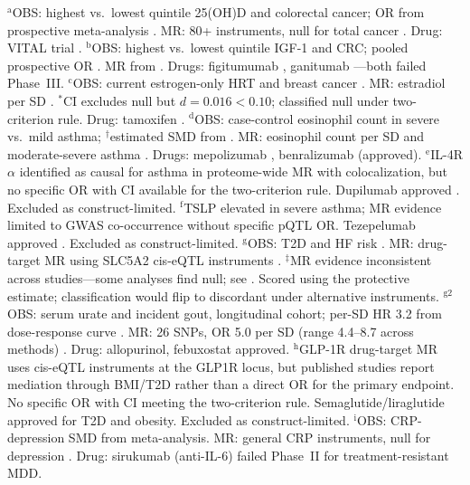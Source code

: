 \documentclass[11pt]{article}
\begin{document}
\begin{table}[t]
\vspace{1mm}
{\footnotesize
$^\text{a}$OBS: highest vs.\ lowest quintile 25(OH)D and colorectal cancer; OR from prospective meta-analysis \cite{keum2014vitdobscancer}. MR: 80+ instruments, null for total cancer \cite{ong2021vitdcancer}. Drug: VITAL trial \cite{manson2019vital}.
$^\text{b}$OBS: highest vs.\ lowest quintile IGF-1 and CRC; pooled prospective OR \cite{rinaldi2019igfobs}. MR from \citet{larsson2020igfcancer}. Drugs: figitumumab \cite{langer2014figitumumab}, ganitumab \cite{juergens2023ganitumab}---both failed Phase~III.
$^\text{c}$OBS: current estrogen-only HRT and breast cancer \cite{beral2003mws}. MR: estradiol per SD \cite{shi2023estradiolBC}. $^*$CI excludes null but $d = 0.016 < 0.10$; classified null under two-criterion rule. Drug: tamoxifen \cite{cuzick2015tamoxifen}.
$^\text{d}$OBS: case-control eosinophil count in severe vs.\ mild asthma; $^\dagger$estimated SMD from \citet{wagener2022eosinophils}. MR: eosinophil count per SD and moderate-severe asthma \cite{han2020eosinophilasthma}. Drugs: mepolizumab \cite{pavord2012dream}, benralizumab (approved).
$^\text{e}$IL-4R$\alpha$ identified as causal for asthma in proteome-wide MR with colocalization, but no specific OR with CI available for the two-criterion rule. Dupilumab approved \cite{busse2019dupilumab}. Excluded as construct-limited.
$^\text{f}$TSLP elevated in severe asthma; MR evidence limited to GWAS co-occurrence without specific pQTL OR. Tezepelumab approved \cite{menzies2022tezepelumab}. Excluded as construct-limited.
$^\text{g}$OBS: T2D and HF risk \cite{ference2019}. MR: drug-target MR using SLC5A2 cis-eQTL instruments \cite{zheng2020sglt2mr}. $^\ddagger$MR evidence inconsistent across studies---some analyses find null; see \citet{sglt2paradox2025}. Scored using the protective estimate; classification would flip to discordant under alternative instruments.
$^\text{g2}$OBS: serum urate and incident gout, longitudinal cohort; per-SD HR 3.2 from dose-response curve \cite{robinson2021urate}. MR: 26 SNPs, OR 5.0 per SD (range 4.4--8.7 across methods) \cite{li2019uratemr}. Drug: allopurinol, febuxostat approved.
$^\text{h}$GLP-1R drug-target MR uses cis-eQTL instruments at the GLP1R locus, but published studies report mediation through BMI/T2D rather than a direct OR for the primary endpoint. No specific OR with CI meeting the two-criterion rule. Semaglutide/liraglutide approved for T2D and obesity. Excluded as construct-limited.
$^\text{i}$OBS: CRP-depression SMD from \citet{howren2009} meta-analysis. MR: general CRP instruments, null for depression \cite{elliott2009}. Drug: sirukumab (anti-IL-6) failed Phase~II for treatment-resistant MDD.
}
\end{table}
\end{document}
